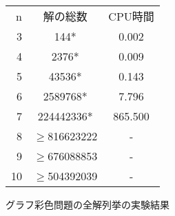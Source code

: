 \begin{tabular}{r|c|c}
 \hline
 n& 解の総数& CPU時間\\
 3&144*&0.002\\
 4&2376*&0.009\\
 5&43536*&0.143\\
 6&2589768*&7.796\\
 7&224442336*&865.500\\
 8&$\geq$816623222&-\\
 9&$\geq$676088853&-\\
 10&$\geq$504392039&-\\
\end{tabular}
\caption{グラフ彩色問題の全解列挙の実験結果}
\label{table:enum}
